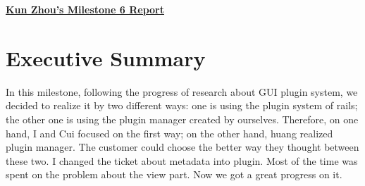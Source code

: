 \pagestyle{headings}

\begin{center}
{\large\textbf{\underline{{Kun Zhou's Milestone 6 Report}}}}
\end{center}

\section*{Executive Summary}

In this milestone, following the progress of research about GUI plugin system, we decided to realize it by two different ways: one is using the plugin system of rails; the other one is using the plugin manager created by ourselves. Therefore, on one hand, I and Cui focused on the first way; on the other hand, huang realized plugin manager. The customer could choose the better way they thought between these two. I changed the ticket about metadata into plugin. Most of the time was spent on the problem about the view part. Now we got a great progress on it. 

